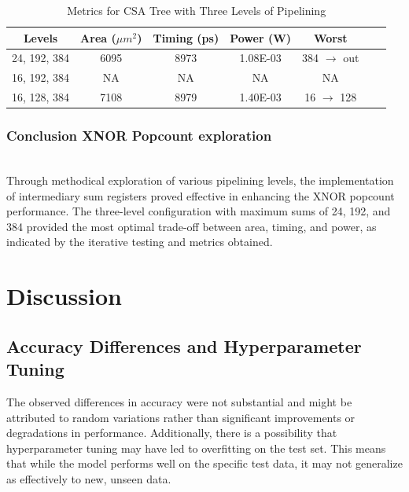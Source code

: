 \documentclass[conference]{IEEEtran}
\newcounter{todocount}
\newcommand{\todo}[1]{
  \stepcounter{todocount}
}
\begin{document}
\begin{table}[h]
    \centering
    \caption{Metrics for CSA Tree with Three Levels of Pipelining}
    \label{tab:three_level}
    \begin{tabular}{@{}ccccccc@{}}
        \toprule
        \textbf{Levels} & \textbf{Area ($\mu m^2$)} & \textbf{Timing (ps)} & \textbf{Power (W)} & \textbf{Worst} \\
        \midrule
        24, 192, 384 & 6095 & 8973 & 1.08E-03 & 384 $\rightarrow$ out\\
        16, 192, 384 & NA & NA & NA & NA \\
        16, 128, 384 & 7108 & 8979 & 1.40E-03 & 16 $\rightarrow$ 128 \\
        \bottomrule
    \end{tabular}
\end{table}

\subsubsection{Conclusion XNOR Popcount exploration}
\hfill\\

Through methodical exploration of various pipelining levels, the implementation of intermediary sum registers proved effective in enhancing the XNOR popcount performance. The three-level configuration with maximum sums of 24, 192, and 384 provided the most optimal trade-off between area, timing, and power, as indicated by the iterative testing and metrics obtained.





\section{Discussion}
\label{sec:discussion}
\todo{timing is slower in lower hidden size}

    \subsection{Accuracy Differences and Hyperparameter Tuning}
    The observed differences in accuracy were not substantial and might be attributed to random variations rather than significant improvements or degradations in performance. Additionally, there is a possibility that hyperparameter tuning may have led to overfitting on the test set. This means that while the model performs well on the specific test data, it may not generalize as effectively to new, unseen data.
\end{document}
